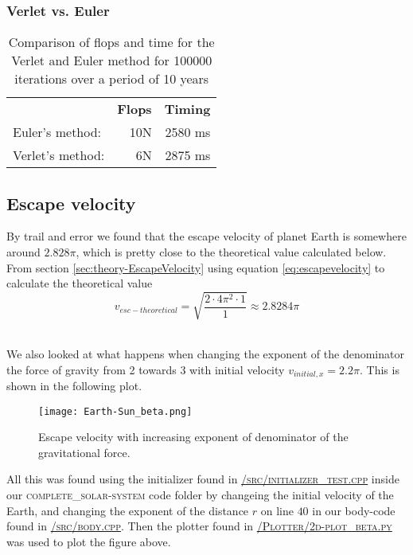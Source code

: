 \documentclass[../main.tex]{subfiles}
\begin{document}
\subsubsection{Verlet vs. Euler}\label{sec:Verlet_VS_Euler}
\begin{table}[!h]
  \caption{Comparison of flops and time for the Verlet and Euler method for 100000 iterations over a period of 10 years}
  \centering
  \begin{tabular}{l r r}
                            &\textbf{Flops}&\textbf{Timing}\\
    Euler's method:          &10N&2580 ms\\
    Verlet's method:          &6N&2875 ms\\
  \end{tabular}
  \label{tab:EulervsVerlet}
  \end{table}
\FloatBarrier

\subsection{Escape velocity} \label{sec:results-esc-vel}
By trail and error we found that the escape velocity of planet Earth is somewhere around $2.828 \pi$, which is pretty close to the theoretical value calculated below.
From section \ref{sec:theory-EscapeVelocity} using equation \eqref{eq:escapevelocity} to calculate the  theoretical value $$v_{esc-theoretical} = \sqrt{\frac{2\cdot4\pi^2\cdot1}{1}} \approx 2.8284 \pi$$\

We also looked at what happens when changing the exponent of the denominator the force of gravity from 2 towards 3 with initial velocity $v_{initial,x} = 2.2\pi$. This is shown in the following plot.

\begin{figure}[h!]
  \centering
  \texttt{[image: Earth-Sun\_beta.png]}
  \caption{Escape velocity with increasing exponent of denominator of the gravitational force.}
  \label{fig:v_esc_beta}
\end{figure}
\FloatBarrier
All this was found using the initializer found in \href{https://github.com/kmaasrud/Project-5/blob/master/code/complete_solar-system/src/initialize_test.cpp}{\textsc{/src/initializer\_test.cpp}} inside our \textsc{complete\_solar-system} code folder by changeing the initial velocity of the Earth, and changing the exponent of the distance $r$ on line $40$ in our body-code found in \href{https://github.com/kmaasrud/Project-5/blob/master/code/complete_solar-system/src/body.cpp}{\textsc{/src/body.cpp}}. Then the plotter found in \href{https://github.com/kmaasrud/Project-5/blob/master/code/Plotter/2d-plot_beta.py}{\textsc{/Plotter/2d-plot\_beta.py}} was used to plot the figure above.
\end{document}
